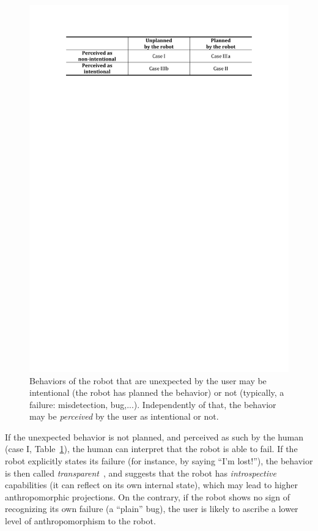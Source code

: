 \documentclass{frontiersSCNS} %
\begin{document}
\begin{figure}
    \centering
    \includegraphics[width=0.75\columnwidth]{un-expected-behavior.pdf}
    \caption{Behaviors of the robot that are unexpected by the user may be intentional
    (the robot has planned the behavior) or not (typically, a failure:
    misdetection, bug,...). Independently of that, the behavior may be
    \emph{perceived} by the user as intentional or not.}

    \label{fig:perceptionUnexpectedBehavior}
\end{figure}


If the unexpected behavior is not planned, and perceived as such by the human
(case I, Table~\ref{fig:perceptionUnexpectedBehavior}), the human can interpret
that the robot is able to fail. If the robot explicitly states its failure (for
instance, by saying ``I'm lost!''), the behavior is then called
\emph{transparent}~\citep{kim_who_2006}, and suggests that the robot has
\emph{introspective} capabilities (it can reflect on its own internal state),
which may lead to higher anthropomorphic projections.  On the contrary, if the
robot shows no sign of recognizing its own failure (a ``plain'' bug), the user
is likely to ascribe a lower level of anthropomorphism to the robot.
\end{document}
